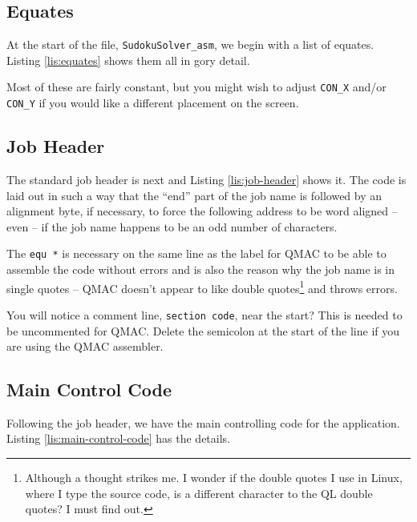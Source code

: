 \subsection{Equates}

At the start of the file, \texttt{SudokuSolver\_asm}, we begin with
a list of equates. Listing \ref{lis:equates} shows them all in gory
detail.



Most of these are fairly constant, but you might wish to adjust \texttt{CON\_X}
and/or \texttt{CON\_Y} if you would like a different placement on
the screen.

\subsection{Job Header}

The standard job header is next and Listing \ref{lis:job-header}
shows it. The code is laid out in such a way that the ``end'' part
of the job name is followed by an alignment byte, if necessary, to
force the following address to be word aligned -- even -- if the
job name happens to be an odd number of characters. 



The \texttt{equ {*}} is necessary on the same line as the label for
QMAC to be able to assemble the code without errors and is also the
reason why the job name is in single quotes -- QMAC doesn't appear
to like double quotes\footnote{Although a thought strikes me. I wonder if the double quotes I use
in Linux, where I type the source code, is a different character to
the QL double quotes? I must find out.} and throws errors.

You will notice a comment line, \texttt{section code}, near the start?
This is needed to be uncommented for QMAC. Delete the semicolon at
the start of the line if you are using the QMAC assembler.

\subsection{Main Control Code}

Following the job header, we have the main controlling code for the
application. Listing \ref{lis:main-control-code} has the details.

